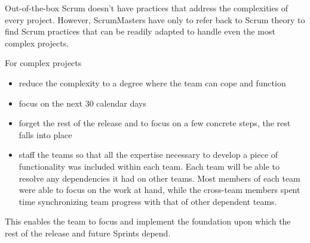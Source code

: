 Out-of-the-box Scrum doesn’t have practices that address the complexities of every project. However, ScrumMasters have only to refer back to Scrum theory to find Scrum practices that can be readily adapted to handle even the most complex projects.

For complex projects
\begin{itemize}
  \item reduce the complexity to a degree where the team can cope and function
  \item focus on the next 30 calendar days
  \item forget the rest of the release and to focus on a few concrete steps, the rest falls into place
  \item staff the teams so that all the expertise necessary to develop a piece of functionality was included within each team. Each team will be able to resolve any dependencies it had on other teams. Most members of each team were able to focus on the work at hand, while the cross-team members spent time synchronizing team progress with that of other dependent teams.
\end{itemize}

This enables the team to focus and implement the foundation upon which the rest of the release and future Sprints depend.